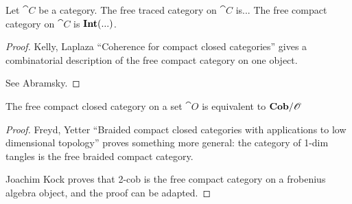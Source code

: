 \documentclass[12pt,oneside,article,draft]{memoir}
\begin{document}
\begin{proposition}\label{prop:free traced and compact}
	Let $\cat{C}$ be a category.
	The free traced category on $\cat{C}$ is...
	The free compact category on $\cat{C}$ is $\mathbf{Int}(...)$.
\end{proposition}
\begin{proof}
	Kelly, Laplaza ``Coherence for compact closed categories'' gives a combinatorial description of the free compact category on one object.

	See Abramsky.
\end{proof}

\begin{proposition}\label{prop:free compact is Cob}
	The free compact closed category on a set $\cat{O}$ is equivalent to $\mathbf{Cob}/\mathscr{O}$
\end{proposition}
\begin{proof}
	Freyd, Yetter ``Braided compact closed categories with applications to low dimensional topology'' proves something more general: the category of 1-dim tangles is the free braided compact category.

	Joachim Kock proves that 2-cob is the free compact category on a frobenius algebra object, and the proof can be adapted.
\end{proof}



\end{document}
